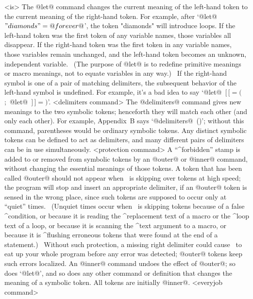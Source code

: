 <is>\is[=]\alt[:=]
\endsyntax
The @let@ command changes the current meaning of the left-hand token
to the current meaning of the right-hand token. For example,
after `@let@ $"diamonds"=@forever@$', the token "diamonds" will
introduce loops. If the left-hand token was the first token of
any variable names, those variables all disappear. If the right-hand
token was the first token in any variable names, those variables
remain unchanged, and the left-hand token becomes
an unknown, independent variable. \ (The purpose of @let@ is to redefine
primitive meanings or macro meanings, not to equate variables in any way.)
\ If the right-hand symbol is one of a pair of matching delimiters,
the subsequent behavior of the left-hand symbol is undefined.
For example, it's a bad idea to say `@let@~$[\,[=($;~@let@~$]\,]=)$'.
\beginsyntax
<delimiters command>
\endsyntax
The @delimiters@ command gives new meanings to the two symbolic tokens;
henceforth they will match each other (and only each other). For example,
Appendix~B says `@delimiters@~()'; without this command, parentheses
would be ordinary symbolic tokens. Any distinct symbolic tokens can be
defined to act as delimiters, and many different pairs of delimiters
can be in use simultaneously.
\beginsyntax
<protection command>
\endsyntax
A ``^{forbidden}'' stamp is added to or removed from symbolic tokens
by an @outer@ or @inner@ command, without changing the essential meanings
of those tokens. A token that has been called @outer@ should not appear
when \MF\ is skipping over tokens at high speed; the program will stop
and insert an appropriate delimiter, if an @outer@ token is sensed in
the wrong place, since such tokens are supposed to occur only at
``quiet'' times. \ (Unquiet times occur when \MF\ is skipping tokens
because of a false ^{condition}, or because it is reading the ^{replacement
text} of a macro or the ^{loop text} of a loop, or because it is scanning
the ^{text argument} to a macro, or because it is ^{flushing} erroneous
tokens that were found at the end of a statement.) \ Without such
protection, a missing right delimiter could cause \MF\ to eat up your
whole program before any error was detected; @outer@ tokens keep such
errors localized.  An @inner@ command undoes the effect of @outer@; so
does `@let@', and so does any other command or definition that changes the
meaning of a symbolic token.  All tokens are initially @inner@.
\beginsyntax
<everyjob command>
\endsyntax
